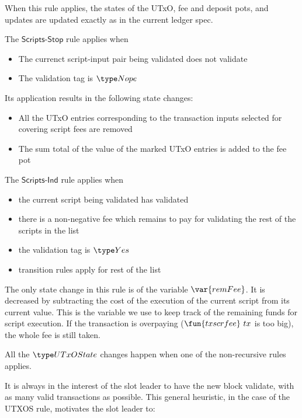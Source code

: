 When this rule applies, the states of the UTxO, fee
  and deposit pots, and updates are updated exactly as in the current
  ledger spec.

The $\mathsf{Scripts\mbox{-}Stop}$ rule applies when

\begin{itemize}
  \item The currenct script-input pair being validated does not validate
  \item The validation tag is $\Nope$
\end{itemize}

Its application results in the following state changes:

\begin{itemize}
  \item All the
  UTxO entries corresponding to the transaction inputs selected for covering
  script fees are removed

  \item The sum total of the value of the marked UTxO entries
  is added to the fee pot
\end{itemize}

The $\mathsf{Scripts\mbox{-}Ind}$ rule applies when

\begin{itemize}
  \item the current script being validated has validated
  \item there is a non-negative fee which remains to pay for validating
  the rest of the scripts in the list
  \item the validation tag is $\Yes$
  \item transition rules apply for rest of the list
\end{itemize}

The only state change in this rule is of the variable $\var{remFee}$.
It is decreased by subtracting the cost of the execution of the
current script from its current value.
This is the variable we use to keep track of the remaining funds for
script execution. If the transaction is overpaying ($\fun{txscrfee}~{tx}$
is too big), the whole fee is still taken.

All the $\UTxOState$ changes happen when one of the non-recursive rules
applies.

It is always in the interest of the slot leader to have the new block validate,
with as many valid transactions as possible. This general heuristic,
in the case of the UTXOS rule, motivates the
slot leader to:

